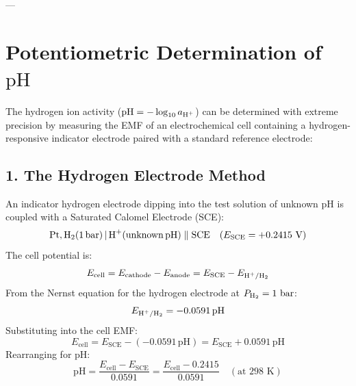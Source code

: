 ---

\section{Potentiometric Determination of $\text{pH}$}

The hydrogen ion activity ($\text{pH} = -\log_{10} a_{\ce{H+}}$) can be determined with extreme precision by measuring the EMF of an electrochemical cell containing a hydrogen-responsive indicator electrode paired with a standard reference electrode:

\subsection{1. The Hydrogen Electrode Method}
An indicator hydrogen electrode dipping into the test solution of unknown $\text{pH}$ is coupled with a Saturated Calomel Electrode (SCE):
\begin{equation}
    \ce{Pt, H2(1 bar) | H+(unknown pH)} \parallel \text{SCE} \quad (E_{\text{SCE}} = +0.2415\text{ V})
\end{equation}
The cell potential is:
\begin{equation}
    E_{\text{cell}} = E_{\text{cathode}} - E_{\text{anode}} = E_{\text{SCE}} - E_{\ce{H+/H2}}
\end{equation}
From the Nernst equation for the hydrogen electrode at $P_{\ce{H2}} = 1\text{ bar}$:
\begin{equation}
    E_{\ce{H+/H2}} = -0.0591\,\text{pH}
\end{equation}
Substituting into the cell EMF:
\begin{equation}
    E_{\text{cell}} = E_{\text{SCE}} - (-0.0591\,\text{pH}) = E_{\text{SCE}} + 0.0591\,\text{pH}
\end{equation}
Rearranging for $\text{pH}$:
\begin{equation}
    \boxed{\text{pH} = \frac{E_{\text{cell}} - E_{\text{SCE}}}{0.0591} = \frac{E_{\text{cell}} - 0.2415}{0.0591}} \quad (\text{at } 298\text{ K})
\end{equation}

